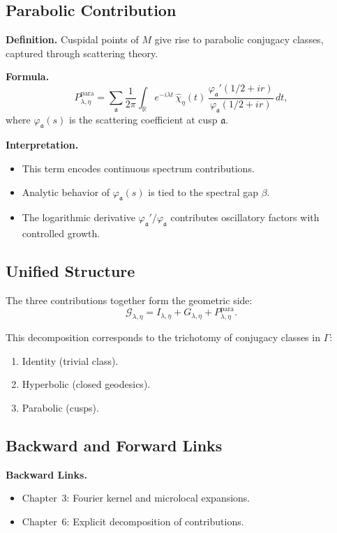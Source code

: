 \subsection{Parabolic Contribution}

\noindent\textbf{Definition.}
Cuspidal points of $M$ give rise to parabolic conjugacy classes, captured through scattering theory.

\medskip

\noindent\textbf{Formula.}
\[
  P_{\lambda,\eta}^{\mathrm{para}}
  = \sum_{\mathfrak{a}} \frac{1}{2\pi}\int_{\mathbb{R}}
    e^{-i\lambda t}\, \widehat{\chi}_\eta(t)\,
    \frac{\varphi_\mathfrak{a}'(1/2+ir)}{\varphi_\mathfrak{a}(1/2+ir)}\, dt,
\]
where $\varphi_\mathfrak{a}(s)$ is the scattering coefficient at cusp $\mathfrak{a}$.

\noindent\textbf{Interpretation.}
\begin{itemize}
  \item This term encodes continuous spectrum contributions.
  \item Analytic behavior of $\varphi_\mathfrak{a}(s)$ is tied to the spectral gap $\beta$.
  \item The logarithmic derivative $\varphi_\mathfrak{a}'/\varphi_\mathfrak{a}$ contributes oscillatory factors with controlled growth.
\end{itemize}

\subsection{Unified Structure}

The three contributions together form the geometric side:
\[
  \mathcal{G}_{\lambda,\eta}
  = I_{\lambda,\eta} + G_{\lambda,\eta} + P_{\lambda,\eta}^{\mathrm{para}}.
\]

This decomposition corresponds to the trichotomy of conjugacy classes in $\Gamma$:
\begin{enumerate}
  \item Identity (trivial class).
  \item Hyperbolic (closed geodesics).
  \item Parabolic (cusps).
\end{enumerate}

\subsection{Backward and Forward Links}

\noindent\textbf{Backward Links.}
\begin{itemize}
  \item Chapter~3: Fourier kernel and microlocal expansions.
  \item Chapter~6: Explicit decomposition of contributions.
\end{itemize}

